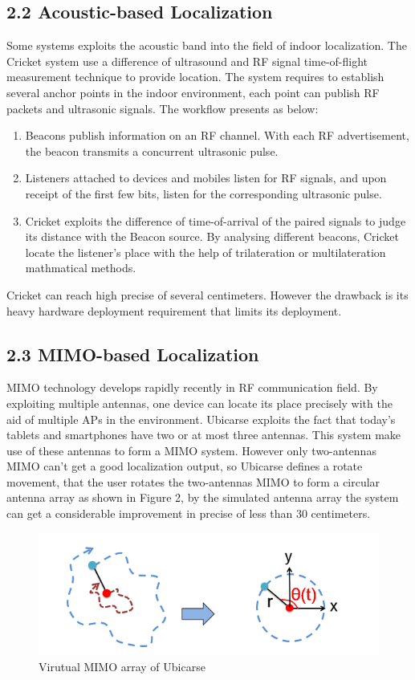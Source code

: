 \documentclass[a4paper, 11pt]{article} %
\begin{document}
\subsection*{2.2 Acoustic-based Localization \cite{Cricket04}}
Some systems exploits the acoustic band into the field of indoor localization. The Cricket system \cite{Cricket04} use a difference of ultrasound and RF signal time-of-flight measurement technique to provide location. The system requires to establish several anchor points in the indoor environment, each point can publish RF packets and ultrasonic signals. The workflow presents as below: 

\begin{enumerate}
	\item Beacons publish information on an RF channel. With each RF advertisement, the beacon transmits a concurrent ultrasonic pulse.
	\item Listeners attached to devices and mobiles listen for RF signals, and upon receipt of the first few bits, listen for the corresponding ultrasonic pulse.
	\item Cricket exploits the difference of time-of-arrival of the paired signals to judge its distance with the Beacon source. By analysing different beacons, Cricket locate the listener's place with the help of trilateration or multilateration mathmatical methods.
\end{enumerate}

Cricket can reach high precise of several centimeters. However the drawback is its heavy hardware deployment requirement that limits its deployment.


\subsection*{2.3 MIMO-based Localization \cite{Ubicarse14}}
MIMO technology develops rapidly recently in RF communication field. By exploiting multiple antennas, one device can locate its place precisely with the aid of multiple APs in the environment. Ubicarse exploits the fact that today's tablets and smartphones have two or at most three antennas. This system make use of these antennas to form a MIMO system. However only two-antennas MIMO can't get a good localization output, so Ubicarse defines a rotate movement, that the user rotates the two-antennas MIMO to form a circular antenna array as shown in Figure 2, by the simulated antenna array the system can get a considerable improvement in precise of less than 30 centimeters.
\begin{figure}[h]
	\centering 
	\includegraphics[width=0.8\linewidth]{Figure4.png}
	\caption{Virutual MIMO array of Ubicarse}
	\label{fig:subfig}
\end{figure}
\end{document}
